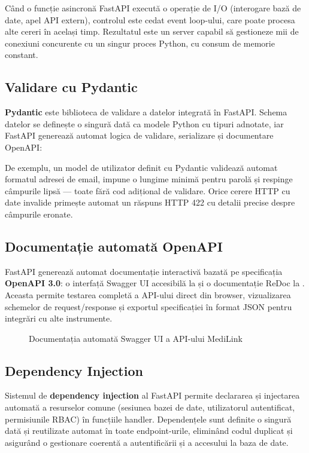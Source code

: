 Când o funcție asincronă FastAPI execută o operație de I/O (interogare bază de date, apel API extern), controlul este cedat event loop-ului, care poate procesa alte cereri în același timp. Rezultatul este un server capabil să gestioneze mii de conexiuni concurente cu un singur proces Python, cu consum de memorie constant.

\subsection{Validare cu Pydantic}

\textbf{Pydantic} \cite{pydantic2024} este biblioteca de validare a datelor integrată în FastAPI. Schema datelor se definește o singură dată ca modele Python cu tipuri adnotate, iar FastAPI generează automat logica de validare, serializare și documentare OpenAPI:

De exemplu, un model de utilizator definit cu Pydantic validează automat formatul adresei de email, impune o lungime minimă pentru parolă și respinge câmpurile lipsă — toate fără cod adițional de validare. Orice cerere HTTP cu date invalide primește automat un răspuns HTTP 422 cu detalii precise despre câmpurile eronate.

\subsection{Documentație automată OpenAPI}

FastAPI generează automat documentație interactivă bazată pe specificația \textbf{OpenAPI 3.0}: o interfață Swagger UI accesibilă la  și o documentație ReDoc la . Aceasta permite testarea completă a API-ului direct din browser, vizualizarea schemelor de request/response și exportul specificației în format JSON pentru integrări cu alte instrumente.

\begin{figure}[H]
  \centering
  \caption{Documentația automată Swagger UI a API-ului MediLink}
  \label{fig:swagger}
\end{figure}

\subsection{Dependency Injection}

Sistemul de \textbf{dependency injection} al FastAPI permite declararea și injectarea automată a resurselor comune (sesiunea bazei de date, utilizatorul autentificat, permisiunile RBAC) în funcțiile handler. Dependențele sunt definite o singură dată și reutilizate automat în toate endpoint-urile, eliminând codul duplicat și asigurând o gestionare coerentă a autentificării și a accesului la baza de date.


